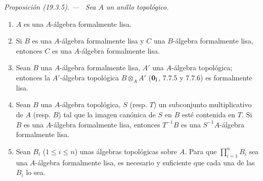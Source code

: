 \documentclass[10pt,oneside]{book}
\makeatletter
\newcommand{\setmanualcurrentlabel}[1]{\def\@currentlabel{#1}}
\newcommand{\oldpage}[2][]{%
  \setcounter{footnote}{0}%
  \marginpar{\scriptsize\textbf{#1}~|~#2}\ignorespaces}
\newenvironment{proposition}[1][]{%
  \setmanualcurrentlabel{#1}\par\medskip\noindent\itshape Proposición (#1). ---\ }{\par}
\makeatother
\begin{document}
\begin{proposition}[19.3.5]
\label{0.19.3.5-es}
Sea $A$ un anillo topológico.
\begin{enumerate}
  \item[\textup{(i)}] $A$ es una $A$-álgebra formalmente lisa.
  \item[\textup{(ii)}] Si $B$ es una $A$-álgebra formalmente lisa y $C$ una
  $B$-álgebra formalmente lisa, entonces $C$ es una $A$-álgebra formalmente
  lisa.
  \item[\textup{(iii)}] Sean $B$ una $A$-álgebra formalmente lisa, $A'$ una
  $A$-álgebra topológica; entonces la $A'$-álgebra topológica
  $B\otimes_A A'$ \textup{($\mathbf 0_{\rm I}$, 7.7.5 y 7.7.6)} es formalmente
  lisa.
  \item[\textup{(iv)}] Sean $B$ una $A$-álgebra topológica, $S$ \textup{(resp. $T$)} un
  subconjunto multiplicativo de $A$ \textup{(resp. $B$)} tal que la imagen canónica de $S$
  en $B$ esté contenida en $T$. Si $B$ es una $A$-álgebra formalmente
  lisa, entonces $T^{-1}B$ es una $S^{-1}A$-álgebra formalmente lisa.
  \item[\textup{(v)}] Sean $B_i$ \textup{($1\leq i\leq n$)} unas álgebras topológicas sobre $A$.
  Para que $\prod_{i=1}^n B_i$ sea una $A$-álgebra formalmente lisa, es
  necesario y suficiente que cada una de las $B_i$ lo sea.
\end{enumerate}
\end{proposition}

\oldpage[0\textsubscript{IV-1}]{82}
\end{document}
